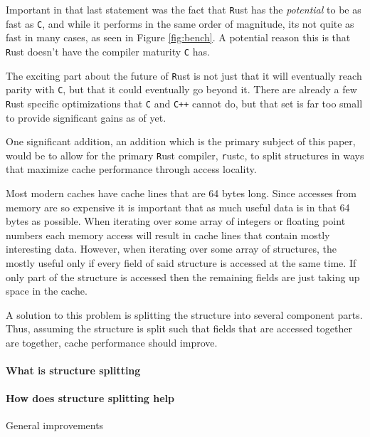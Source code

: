 \documentclass[12pt,final]{article}
\newcommand{\rustname}{{\texttt Rust}}
\def \rust {\rustname{}\xspace}
\newcommand{\rustcname}{{\texttt rustc}}
\def \rustc {\rustcname{}\xspace}
\newcommand{\cname}{{\texttt{C}}}
\def \c {\cname{}\xspace}
\newcommand{\cppname}{{\texttt{C++}}}
\def \cpp {\cppname{}\xspace}
\begin{document}
Important in that last statement was the fact that \rust has the \textit{potential}
to be as fast as \c, and while it performs in the same order of magnitude, its not
quite as fast in many cases, as seen in Figure \ref{fig:bench}.
A potential reason this is that \rust doesn't have the compiler maturity \c has.

The exciting part about the future of \rust is not just that it will eventually
reach parity with \c, but that it could eventually go beyond it. There are
already a few \rust specific optimizations that \c and \cpp cannot do, but that
set is far too small to provide significant gains as of yet.


One significant addition, an addition which is the primary subject of this
paper, would be to allow for the primary \rust compiler, \rustc, to split
structures in ways that maximize cache performance through access locality.

Most modern caches have cache lines that are 64 bytes long. Since accesses from
memory are so expensive it is important that as much useful data is in that 64
bytes as possible. When iterating over some array of integers or floating point
numbers each memory access will result in cache lines that contain mostly
interesting data. However, when iterating over some array of structures,
the mostly useful only
if every field of said structure is accessed at the same time. If only part of
the structure is accessed then the remaining fields are just taking up space in
the cache.

A solution to this problem is splitting the structure into several component
parts. Thus, assuming the structure is split such that fields that are accessed
together are together, cache performance should improve. 


\paragraph{What is structure splitting}

\paragraph{How does structure splitting help}
General improvements
\end{document}
